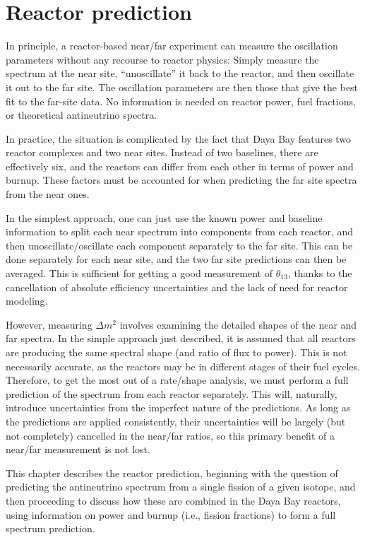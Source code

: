 \documentclass[../thesis.tex]{subfiles}
\begin{document}
\chapter{Reactor prediction}
\label{chap:bkg}

In principle, a reactor-based near/far experiment can measure the oscillation parameters without any recourse to reactor physics: Simply measure the spectrum at the near site, ``unoscillate'' it back to the reactor, and then oscillate it out to the far site. The oscillation parameters are then those that give the best fit to the far-site data. No information is needed on reactor power, fuel fractions, or theoretical antineutrino spectra.

In practice, the situation is complicated by the fact that Daya Bay features two reactor complexes and two near sites. Instead of two baselines, there are effectively six, and the reactors can differ from each other in terms of power and burnup. These factors must be accounted for when predicting the far site spectra from the near ones.

In the simplest approach, one can just use the known power and baseline information to split each near spectrum into components from each reactor, and then unoscillate/oscillate each component separately to the far site. This can be done separately for each near site, and the two far site predictions can then be averaged. This is sufficient for getting a good measurement of $\theta_{13}$, thanks to the cancellation of absolute efficiency uncertainties and the lack of need for reactor modeling.

However, measuring $\Delta m^2$ involves examining the detailed shapes of the near and far spectra. In the simple approach just described, it is assumed that all reactors are producing the same spectral shape (and ratio of flux to power). This is not necessarily accurate, as the reactors may be in different stages of their fuel cycles. Therefore, to get the most out of a rate/shape analysis, we must perform a full prediction of the spectrum from each reactor separately. This will, naturally, introduce uncertainties from the imperfect nature of the predictions. As long as the predictions are applied consistently, their uncertainties will be largely (but not completely) cancelled in the near/far ratios, so this primary benefit of a near/far measurement is not lost.

This chapter describes the reactor prediction, beginning with the question of predicting the antineutrino spectrum from a single fission of a given isotope, and then proceeding to discuss how these are combined in the Daya Bay reactors, using information on power and burnup (i.e., fission fractions) to form a full spectrum prediction.
\end{document}
